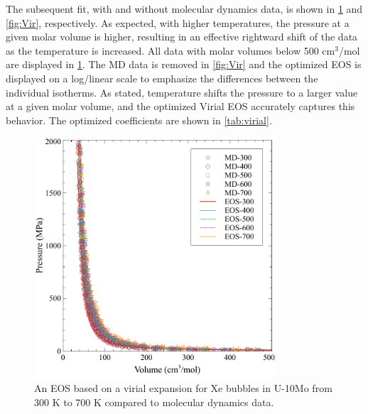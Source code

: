 \documentclass[review]{elsarticle}
\begin{document}
The subsequent fit, with and without molecular dynamics data, is shown in \cref{fig:MD_Vir} and \cref{fig:Vir}, respectively. As expected, with higher temperatures, the pressure at a given molar volume is higher, resulting in an effective rightward shift of the data as the temperature is increased. All data with molar volumes below 500 cm$^3$/mol are displayed in \cref{fig:MD_Vir}. The MD data is removed in \cref{fig:Vir} and the optimized EOS is displayed on a log/linear scale to emphasize the differences between the individual isotherms. As stated, temperature shifts the pressure to a larger value at a given molar volume, and the optimized Virial EOS accurately captures this behavior. The optimized coefficients are shown in \cref{tab:virial}. 

\begin{figure}[h!]
 \centering
 \includegraphics[width=0.8\textwidth]{MD_Virial} 
 \caption{An EOS based on a virial expansion for Xe bubbles in U-10Mo from 300 K to 700 K compared to molecular dynamics data. }
 \label{fig:MD_Vir}
\end{figure}
\end{document}
